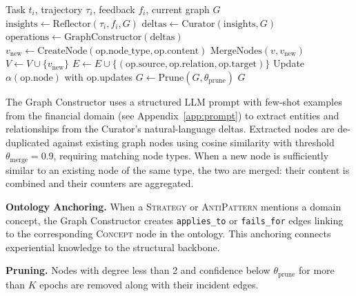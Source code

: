 \documentclass[12pt,a4paper,oneside]{article}
\begin{document}
\begin{algorithm}[H]
\caption{GSAM Graph Construction Pipeline}
\label{alg:construction}
\begin{algorithmic}[1]
\REQUIRE Task $t_i$, trajectory $\tau_i$, feedback $f_i$, current graph $G$
\STATE $\text{insights} \leftarrow \text{Reflector}(\tau_i, f_i, G)$
\STATE $\text{deltas} \leftarrow \text{Curator}(\text{insights}, G)$
\STATE $\text{operations} \leftarrow \text{GraphConstructor}(\text{deltas})$
        \STATE $v_{\text{new}} \leftarrow \text{CreateNode}(\text{op.node\_type}, \text{op.content})$
            \STATE $\text{MergeNodes}(v, v_{\text{new}})$ 
        \ELSE
            \STATE $V \leftarrow V \cup \{v_{\text{new}}\}$
        \ENDIF
        \STATE $E \leftarrow E \cup \{(\text{op.source}, \text{op.relation}, \text{op.target})\}$
        \STATE Update $\alpha(\text{op.node})$ with op.updates 
    \ENDIF
\ENDFOR
\STATE $G \leftarrow \text{Prune}(G, \theta_{\text{prune}})$ 
\RETURN $G$
\end{algorithmic}
\end{algorithm}

The Graph Constructor uses a structured LLM prompt with few-shot examples from the financial domain (see Appendix~\ref{app:prompt}) to extract entities and relationships from the Curator's natural-language deltas. Extracted nodes are de-duplicated against existing graph nodes using cosine similarity with threshold $\theta_{\text{merge}} = 0.9$, requiring matching node types. When a new node is sufficiently similar to an existing node of the same type, the two are merged: their content is combined and their counters are aggregated.

\textbf{Ontology Anchoring.} When a \textsc{Strategy} or \textsc{AntiPattern} mentions a domain concept, the Graph Constructor creates \texttt{applies\_to} or \texttt{fails\_for} edges linking to the corresponding \textsc{Concept} node in the ontology. This anchoring connects experiential knowledge to the structural backbone.

\textbf{Pruning.} Nodes with degree less than 2 and confidence below $\theta_{\text{prune}}$ for more than $K$ epochs are removed along with their incident edges.
\end{document}
